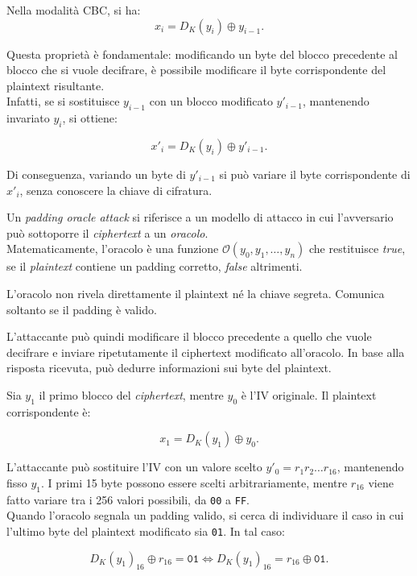 \noindent Nella modalità CBC, si ha:
\[
    x_i = D_K(y_i) \oplus y_{i-1}.
\]


\noindent Questa proprietà è fondamentale:
modificando un byte del blocco precedente al blocco che si vuole
decifrare, è possibile modificare il byte corrispondente del
plaintext risultante. \\ Infatti, se si sostituisce $y_{i-1}$ con un blocco modificato
$y'_{i-1}$, mantenendo invariato $y_i$, si ottiene:

\[
    x'_i = D_K(y_i) \oplus y'_{i-1}.
\]

\noindent Di conseguenza, variando un byte di $y'_{i-1}$ si può variare
il byte corrispondente di $x'_i$, senza conoscere la chiave
di cifratura.


\vspace{0.2cm} \noindent Un \textit{padding oracle attack} si riferisce a un modello di attacco in cui l'avversario può sottoporre il \emph{ciphertext} a un \emph{oracolo}.\\ Matematicamente, l'oracolo è una funzione $\mathcal{O}(y_0, y_1, \dots, y_n)$  che restituisce \textit{true}, se il \emph{plaintext} contiene un padding corretto, \textit{false} altrimenti.

\noindent L'oracolo non rivela direttamente il plaintext né la chiave
segreta. Comunica soltanto se il padding è valido.

\vspace{1em}\noindent L'attaccante può quindi modificare il blocco precedente a quello
che vuole decifrare e inviare ripetutamente il ciphertext modificato
all'oracolo. In base alla risposta ricevuta, può dedurre informazioni
sui byte del plaintext.


\vspace{1em}
\noindent
Sia $y_1$ il primo blocco del \emph{ciphertext}, mentre
$y_0$ è l'IV originale. Il plaintext corrispondente è:

\[
    x_1 = D_K(y_1) \oplus y_0.
\]

\noindent
L'attaccante può sostituire l'IV con un valore scelto
$y'_0 = r_1r_2\dots r_{16}$, mantenendo fisso $y_1$.
I primi 15 byte possono essere scelti arbitrariamente,
mentre $r_{16}$ viene fatto variare tra i 256 valori possibili,
da \texttt{00} a \texttt{FF}.\\ Quando l'oracolo segnala un padding valido, si cerca di
individuare il caso in cui l'ultimo byte del plaintext
modificato sia \texttt{01}. In tal caso:

\[
    D_K(y_1)_{16} \oplus r_{16} = \texttt{01} \iff     D_K(y_1)_{16} = r_{16} \oplus \texttt{01}.
\]

